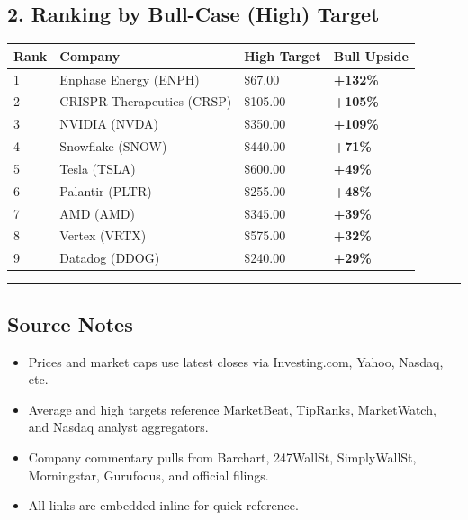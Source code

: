 \documentclass[
]{article}
\providecommand{\tightlist}{%
  \setlength{\itemsep}{0pt}\setlength{\parskip}{0pt}}
\begin{document}
\hypertarget{ranking-by-bull-case-high-target}{%
\subsection{2. Ranking by Bull-Case (High)
Target}\label{ranking-by-bull-case-high-target}}

\begin{longtable}[]{@{}llll@{}}
\toprule
Rank & Company & High Target & Bull Upside \\
\midrule
\endhead
1 & Enphase Energy (ENPH) & \$67.00 & \textbf{+132\%} \\
2 & CRISPR Therapeutics (CRSP) & \$105.00 & \textbf{+105\%} \\
3 & NVIDIA (NVDA) & \$350.00 & \textbf{+109\%} \\
4 & Snowflake (SNOW) & \$440.00 & \textbf{+71\%} \\
5 & Tesla (TSLA) & \$600.00 & \textbf{+49\%} \\
6 & Palantir (PLTR) & \$255.00 & \textbf{+48\%} \\
7 & AMD (AMD) & \$345.00 & \textbf{+39\%} \\
8 & Vertex (VRTX) & \$575.00 & \textbf{+32\%} \\
9 & Datadog (DDOG) & \$240.00 & \textbf{+29\%} \\
\bottomrule
\end{longtable}

\begin{center}\rule{0.5\linewidth}{0.5pt}\end{center}

\hypertarget{source-notes}{%
\subsection{Source Notes}\label{source-notes}}

\begin{itemize}
\tightlist
\item
  Prices and market caps use latest closes via Investing.com, Yahoo,
  Nasdaq, etc.
\item
  Average and high targets reference MarketBeat, TipRanks, MarketWatch,
  and Nasdaq analyst aggregators.
\item
  Company commentary pulls from Barchart, 247WallSt, SimplyWallSt,
  Morningstar, Gurufocus, and official filings.
\item
  All links are embedded inline for quick reference.
\end{itemize}
\end{document}

